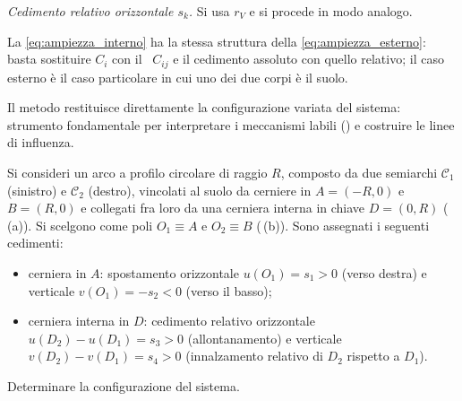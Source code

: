 \smallskip
\noindent\textit{Cedimento relativo orizzontale $s_k$.}
Si usa $r_V$ e si procede in modo analogo.

La \eqref{eq:ampiezza_interno} ha la stessa struttura
della \eqref{eq:ampiezza_esterno}: basta sostituire $C_i$
con il \CRr\ $C_{ij}$ e il cedimento assoluto con quello
relativo; il caso esterno è il caso particolare in cui uno
dei due corpi è il suolo.

Il metodo restituisce direttamente la configurazione variata
del sistema: strumento fondamentale per interpretare i
meccanismi labili () e costruire le
linee di influenza.

\begin{esempio}
	\label{ex:arco_cedimenti}
	Si consideri un arco a profilo circolare di raggio $R$,
	composto da due semiarchi $\mathcal{C}_1$ (sinistro) e
	$\mathcal{C}_2$ (destro), vincolati al suolo da cerniere
	in $A = (-R, 0)$ e $B = (R, 0)$ e collegati fra loro da
	una cerniera interna in chiave $D = (0, R)$ (\,(a)). Si scelgono
	come poli $O_1 \equiv A$ e $O_2 \equiv B$ (\,(b)). Sono assegnati
	i seguenti cedimenti:
	\begin{itemize}[noitemsep]
		\item cerniera in $A$: spostamento orizzontale
		$u(O_1) = s_1 > 0$ (verso destra) e verticale
		$v(O_1) = -s_2 < 0$ (verso il basso);
		\item cerniera interna in $D$: cedimento relativo
		orizzontale $u(D_2) - u(D_1) = s_3 > 0$
		(allontanamento) e verticale
		$v(D_2) - v(D_1) = s_4 > 0$ (innalzamento relativo
		di $D_2$ rispetto a $D_1$).
	\end{itemize}
	Determinare la configurazione del sistema.
	



	
	\begin{svolgimento}
		

\end{svolgimento}
\end{esempio}
